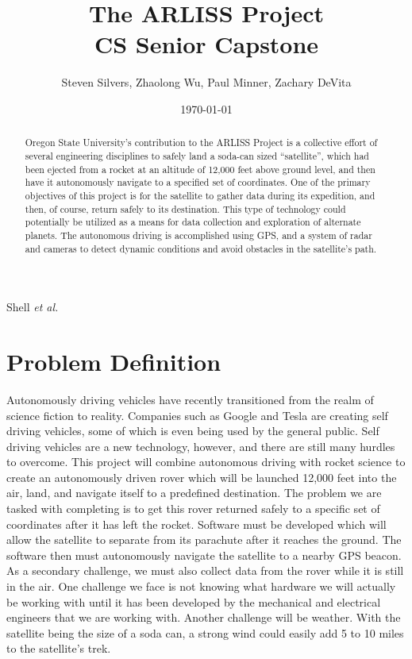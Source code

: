 \documentclass[10pt,onecolumn,draftclsnofoot,journal]{IEEEtran}
\title{The ARLISS Project \\
	\large CS Senior Capstone}
\author{Steven Silvers, Zhaolong Wu, Paul Minner, Zachary DeVita}
\date{\today}
\begin{document}

%
{Shell \MakeLowercase{\textit{et al.}}}
\maketitle
\begin{abstract}
\noindent Oregon State University’s contribution to the ARLISS Project is a collective effort of several engineering disciplines to safely land a soda-can sized “satellite”, which had been ejected from a rocket at an altitude of 12,000 feet above ground level, and then have it autonomously navigate to a specified set of coordinates. One of the primary objectives of this project is for the satellite to gather data during its expedition, and then, of course, return safely to its destination. This type of technology could potentially be utilized as a means for data collection and exploration of alternate planets. The autonomous driving is accomplished using GPS, and a system of radar and cameras to detect dynamic conditions and avoid obstacles in the satellite’s path.
\end{abstract}


\clearpage


\newpage
{}

\section*{\textbf{Problem Definition}}
\noindent Autonomously driving vehicles have recently transitioned from the realm of science fiction to reality. Companies such as Google and Tesla are creating self driving vehicles, some of which is even being used by the general public. Self driving vehicles are a new technology, however, and there are still many hurdles to overcome. This project will combine autonomous driving with rocket science to create an autonomously driven rover which will be launched 12,000 feet into the air, land, and navigate itself to a predefined destination. The problem we are tasked with completing is to get this rover returned safely to a specific set of coordinates after it has left the rocket. Software must be developed which will allow the satellite to separate from its parachute after it reaches the ground. The software then must autonomously navigate the satellite to a nearby GPS beacon. As a secondary challenge, we must also collect data from the rover while it is still in the air. One challenge we face is not knowing what hardware we will actually be working with until it has been developed by the mechanical and electrical engineers that we are working with. Another challenge will be weather. With the satellite being the size of a soda can, a strong wind could easily add 5 to 10 miles to the satellite’s trek.
\end{document}
